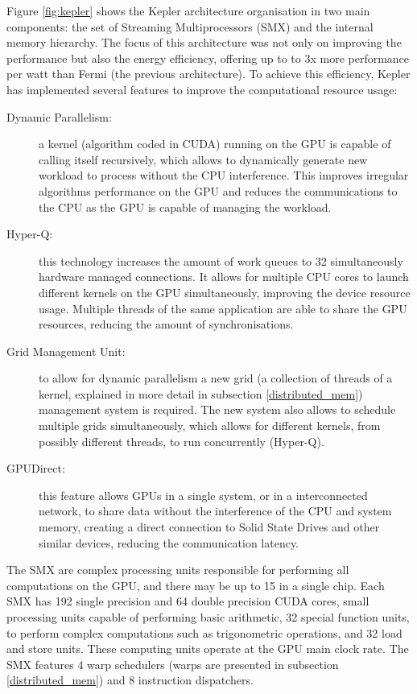 Figure \ref{fig:kepler} shows the Kepler architecture organisation in two main components: the set of Streaming Multiprocessors (SMX) and the internal memory hierarchy. The focus of this architecture was not only on improving the performance but also the energy efficiency, offering up to to 3x more performance per watt than Fermi (the previous architecture). To achieve this efficiency, Kepler has implemented several features to improve the computational resource usage:

\begin{description}
	\item[Dynamic Parallelism:] a kernel (algorithm coded in CUDA) running on the GPU is capable of calling itself recursively, which allows to dynamically generate new workload to process without the CPU interference. This improves irregular algorithms performance on the GPU and reduces the communications to the CPU as the GPU is capable of managing the workload.
	\item[Hyper-Q:] this technology increases the amount of work queues to 32 simultaneously hardware managed connections. It allows for multiple CPU cores to launch different kernels on the GPU simultaneously, improving the device resource usage. Multiple threads of the same application are able to share the GPU resources, reducing the amount of synchronisations.
	\item[Grid Management Unit:] to allow for dynamic parallelism a new grid (a collection of threads of a kernel, explained in more detail in subsection \ref{distributed_mem}) management system is required. The new system also allows to schedule multiple grids simultaneously, which allows for different kernels, from possibly different threads, to run concurrently (Hyper-Q).
	\item[\nvidia GPUDirect:] this feature allows GPUs in a single system, or in a interconnected network, to share data without the interference of the CPU and system memory, creating a direct connection to Solid State Drives and other similar devices, reducing the communication latency.
\end{description}

The SMX are complex processing units responsible for performing all computations on the GPU, and there may be up to 15 in a single chip. Each SMX has 192 single precision and 64 double precision CUDA cores, small processing units capable of performing basic arithmetic, 32 special function units, to perform complex computations such as trigonometric operations, and 32 load and store units. These computing units operate at the GPU main clock rate. The SMX features 4 warp schedulers (warps are presented in subsection \ref{distributed_mem}) and 8 instruction dispatchers.


